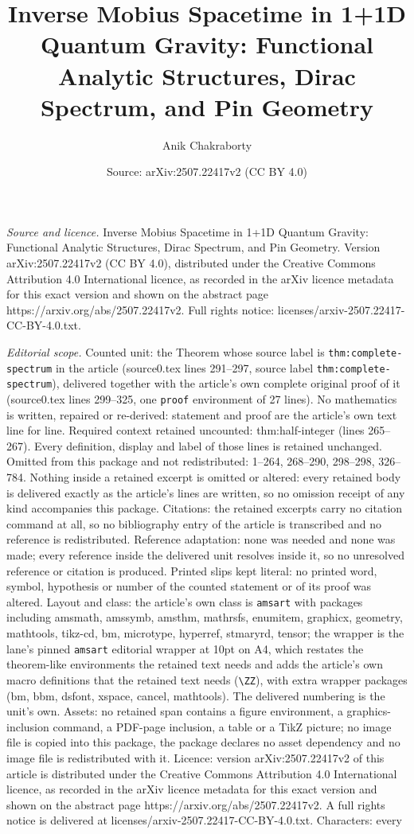 \documentclass[10pt,a4paper]{amsart}
\title[Inverse Mobius Spacetime in 1+1D Quantum Gravity: Functional]{Inverse Mobius Spacetime in 1+1D Quantum Gravity: Functional Analytic Structures, Dirac Spectrum, and Pin Geometry}
\author{Anik Chakraborty}
\date{Source: arXiv:2507.22417v2 (CC BY 4.0)}
\begin{document}
\maketitle

\noindent\emph{Source and licence.} Inverse Mobius Spacetime in 1+1D Quantum Gravity: Functional Analytic Structures, Dirac Spectrum, and Pin Geometry. Version arXiv:2507.22417v2 (CC BY 4.0), distributed under the Creative Commons Attribution 4.0 International licence, as recorded in the arXiv licence metadata for this exact version and shown on the abstract page https://arxiv.org/abs/2507.22417v2. Full rights notice: licenses/arxiv-2507.22417-CC-BY-4.0.txt.\par\smallskip

\noindent\textit{Editorial scope.} Counted unit: the Theorem whose source label is \texttt{thm:complete-spectrum} in the article (source0.tex lines 291--297, source label \texttt{thm:complete-spectrum}), delivered together with the article's own complete original proof of it (source0.tex lines 299--325, one \texttt{proof} environment of 27 lines). No mathematics is written, repaired or re-derived: statement and proof are the article's own text line for line. Required context retained uncounted: thm:half-integer (lines 265--267). Every definition, display and label of those lines is retained unchanged. Omitted from this package and not redistributed: 1--264, 268--290, 298--298, 326--784. Nothing inside a retained excerpt is omitted or altered: every retained body is delivered exactly as the article's lines are written, so no omission receipt of any kind accompanies this package. Citations: the retained excerpts carry no citation command at all, so no bibliography entry of the article is transcribed and no reference is redistributed. Reference adaptation: none was needed and none was made; every reference inside the delivered unit resolves inside it, so no unresolved reference or citation is produced. Printed slips kept literal: no printed word, symbol, hypothesis or number of the counted statement or of its proof was altered. Layout and class: the article's own class is \texttt{amsart} with packages including amsmath, amssymb, amsthm, mathrsfs, enumitem, graphicx, geometry, mathtools, tikz-cd, bm, microtype, hyperref, stmaryrd, tensor; the wrapper is the lane's pinned \texttt{amsart} editorial wrapper at 10pt on A4, which restates the theorem-like environments the retained text needs and adds the article's own macro definitions that the retained text needs (\texttt{\textbackslash ZZ}), with extra wrapper packages (bm, bbm, dsfont, xspace, cancel, mathtools). The delivered numbering is the unit's own. Assets: no retained span contains a figure environment, a graphics-inclusion command, a PDF-page inclusion, a table or a TikZ picture; no image file is copied into this package, the package declares no asset dependency and no image file is redistributed with it. Licence: version arXiv:2507.22417v2 of this article is distributed under the Creative Commons Attribution 4.0 International licence, as recorded in the arXiv licence metadata for this exact version and shown on the abstract page https://arxiv.org/abs/2507.22417v2. A full rights notice is delivered at licenses/arxiv-2507.22417-CC-BY-4.0.txt. Characters: every 
\end{document}
